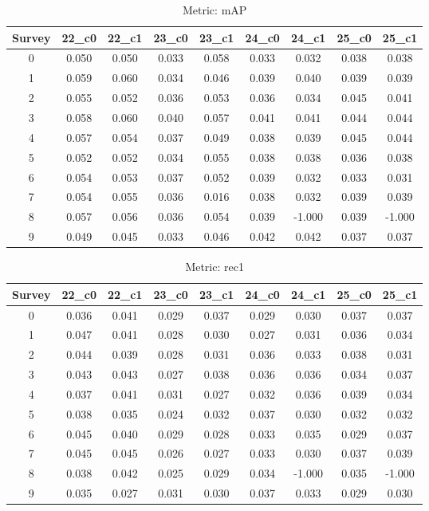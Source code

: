 \documentclass{article}
\begin{document}
\begin{table}[tbh]
\begin{center}
\begin{tabular}{|*{9}{c|}}
\hline
 Survey & 22\_c0 & 22\_c1 & 23\_c0 & 23\_c1 & 24\_c0 & 24\_c1 & 25\_c0 & 25\_c1 \\ 
\hline
0 & 0.050 & 0.050 & 0.033 & 0.058 & 0.033 & 0.032 & 0.038 & 0.038 \\ 
1 & 0.059 & 0.060 & 0.034 & 0.046 & 0.039 & 0.040 & 0.039 & 0.039 \\ 
2 & 0.055 & 0.052 & 0.036 & 0.053 & 0.036 & 0.034 & 0.045 & 0.041 \\ 
3 & 0.058 & 0.060 & 0.040 & 0.057 & 0.041 & 0.041 & 0.044 & 0.044 \\ 
4 & 0.057 & 0.054 & 0.037 & 0.049 & 0.038 & 0.039 & 0.045 & 0.044 \\ 
5 & 0.052 & 0.052 & 0.034 & 0.055 & 0.038 & 0.038 & 0.036 & 0.038 \\ 
6 & 0.054 & 0.053 & 0.037 & 0.052 & 0.039 & 0.032 & 0.033 & 0.031 \\ 
7 & 0.054 & 0.055 & 0.036 & 0.016 & 0.038 & 0.032 & 0.039 & 0.039 \\ 
8 & 0.057 & 0.056 & 0.036 & 0.054 & 0.039 & -1.000 & 0.039 & -1.000 \\ 
9 & 0.049 & 0.045 & 0.033 & 0.046 & 0.042 & 0.042 & 0.037 & 0.037 \\ 
\hline
\end{tabular}
\end{center}
\caption{Metric: mAP}
\end{table}


\begin{table}[tbh]
\begin{center}
\begin{tabular}{|*{9}{c|}}
\hline
 Survey & 22\_c0 & 22\_c1 & 23\_c0 & 23\_c1 & 24\_c0 & 24\_c1 & 25\_c0 & 25\_c1 \\ 
\hline
0 & 0.036 & 0.041 & 0.029 & 0.037 & 0.029 & 0.030 & 0.037 & 0.037 \\ 
1 & 0.047 & 0.041 & 0.028 & 0.030 & 0.027 & 0.031 & 0.036 & 0.034 \\ 
2 & 0.044 & 0.039 & 0.028 & 0.031 & 0.036 & 0.033 & 0.038 & 0.031 \\ 
3 & 0.043 & 0.043 & 0.027 & 0.038 & 0.036 & 0.036 & 0.034 & 0.037 \\ 
4 & 0.037 & 0.041 & 0.031 & 0.027 & 0.032 & 0.036 & 0.039 & 0.034 \\ 
5 & 0.038 & 0.035 & 0.024 & 0.032 & 0.037 & 0.030 & 0.032 & 0.032 \\ 
6 & 0.045 & 0.040 & 0.029 & 0.028 & 0.033 & 0.035 & 0.029 & 0.037 \\ 
7 & 0.045 & 0.045 & 0.026 & 0.027 & 0.033 & 0.030 & 0.037 & 0.039 \\ 
8 & 0.038 & 0.042 & 0.025 & 0.029 & 0.034 & -1.000 & 0.035 & -1.000 \\ 
9 & 0.035 & 0.027 & 0.031 & 0.030 & 0.037 & 0.033 & 0.029 & 0.030 \\ 
\hline
\end{tabular}
\end{center}
\caption{Metric: rec1}
\end{table}
\end{document}
